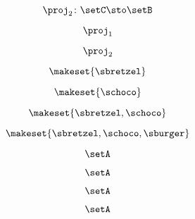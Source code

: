 {\begin{forslides}
        \begin{equation}
            \label{eq:combination-153}
            \proj_2\colon \setC \sto \setB
        \end{equation}

        \begin{equation}
            \label{eq:combination-154}
            \proj_1
        \end{equation}

        \begin{equation}
            \label{eq:combination-155}
            \proj_2
        \end{equation}

        \begin{equation}
            \label{eq:combination-156}
            \makeset{ \sbretzel }
        \end{equation}

        \begin{equation}
            \label{eq:combination-157}
            \makeset{ \schoco }
        \end{equation}

        \begin{equation}
            \label{eq:combination-158}
            \makeset{ \sbretzel, \schoco }
        \end{equation}

        \begin{equation}
            \label{eq:combination-159}
            \makeset{ \sbretzel, \schoco, \sburger }
        \end{equation}

        \begin{equation}
            \label{eq:combination-160}
            \setA
        \end{equation}

        \begin{equation}
            \label{eq:combination-161}
            \setA
        \end{equation}

        \begin{equation}
            \label{eq:combination-162}
            \setA
        \end{equation}

        \begin{equation}
            \label{eq:combination-163}
            \setA
        \end{equation}


\end{forslides}}

